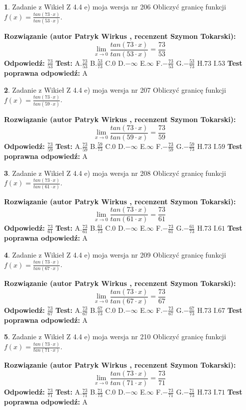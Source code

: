 \documentclass[12pt, a4paper]{article}
\theoremstyle{definition} %
\newtheorem{zad}{}
\newcommand{\zadStart}[1]{\begin{zad}#1\newline}
\newcommand{\zadStop}{\end{zad}}
\newcommand{\rozwStart}[2]{\noindent \textbf{Rozwiązanie (autor #1 , recenzent #2): }\newline}
\newcommand{\rozwStop}{\newline}
\newcommand{\odpStart}{\noindent \textbf{Odpowiedź:}\newline}
\newcommand{\odpStop}{\newline}
\newcommand{\testStart}{\noindent \textbf{Test:}\newline}
\newcommand{\testStop}{\newline}
\newcommand{\kluczStart}{\noindent \textbf{Test poprawna odpowiedź:}\newline}
\newcommand{\kluczStop}{\newline}
\begin{document}
\zadStart{Zadanie z Wikieł Z 4.4 e) moja wersja nr 206}
Obliczyć granicę funkcji $f(x)=\frac{tan(73\cdot x)}{tan(53\cdot x)}$.
\zadStop
\rozwStart{Patryk Wirkus}{Szymon Tokarski}
$$\lim\limits_{x\to 0}\frac{tan(73\cdot x)}{tan(53\cdot x)}=
\frac{73}{53}$$
\rozwStop
\odpStart
$\frac{73}{53}$
\odpStop
\testStart
A.$\frac{73}{53}$
B.$\frac{53}{73}$
C.$0$
D.$-\infty$
E.$\infty$
F.$-\frac{73}{53}$
G.$-\frac{53}{73}$
H.$73$
I.$53$
\testStop
\kluczStart
A
\kluczStop



\zadStart{Zadanie z Wikieł Z 4.4 e) moja wersja nr 207}
Obliczyć granicę funkcji $f(x)=\frac{tan(73\cdot x)}{tan(59\cdot x)}$.
\zadStop
\rozwStart{Patryk Wirkus}{Szymon Tokarski}
$$\lim\limits_{x\to 0}\frac{tan(73\cdot x)}{tan(59\cdot x)}=
\frac{73}{59}$$
\rozwStop
\odpStart
$\frac{73}{59}$
\odpStop
\testStart
A.$\frac{73}{59}$
B.$\frac{59}{73}$
C.$0$
D.$-\infty$
E.$\infty$
F.$-\frac{73}{59}$
G.$-\frac{59}{73}$
H.$73$
I.$59$
\testStop
\kluczStart
A
\kluczStop



\zadStart{Zadanie z Wikieł Z 4.4 e) moja wersja nr 208}
Obliczyć granicę funkcji $f(x)=\frac{tan(73\cdot x)}{tan(61\cdot x)}$.
\zadStop
\rozwStart{Patryk Wirkus}{Szymon Tokarski}
$$\lim\limits_{x\to 0}\frac{tan(73\cdot x)}{tan(61\cdot x)}=
\frac{73}{61}$$
\rozwStop
\odpStart
$\frac{73}{61}$
\odpStop
\testStart
A.$\frac{73}{61}$
B.$\frac{61}{73}$
C.$0$
D.$-\infty$
E.$\infty$
F.$-\frac{73}{61}$
G.$-\frac{61}{73}$
H.$73$
I.$61$
\testStop
\kluczStart
A
\kluczStop



\zadStart{Zadanie z Wikieł Z 4.4 e) moja wersja nr 209}
Obliczyć granicę funkcji $f(x)=\frac{tan(73\cdot x)}{tan(67\cdot x)}$.
\zadStop
\rozwStart{Patryk Wirkus}{Szymon Tokarski}
$$\lim\limits_{x\to 0}\frac{tan(73\cdot x)}{tan(67\cdot x)}=
\frac{73}{67}$$
\rozwStop
\odpStart
$\frac{73}{67}$
\odpStop
\testStart
A.$\frac{73}{67}$
B.$\frac{67}{73}$
C.$0$
D.$-\infty$
E.$\infty$
F.$-\frac{73}{67}$
G.$-\frac{67}{73}$
H.$73$
I.$67$
\testStop
\kluczStart
A
\kluczStop



\zadStart{Zadanie z Wikieł Z 4.4 e) moja wersja nr 210}
Obliczyć granicę funkcji $f(x)=\frac{tan(73\cdot x)}{tan(71\cdot x)}$.
\zadStop
\rozwStart{Patryk Wirkus}{Szymon Tokarski}
$$\lim\limits_{x\to 0}\frac{tan(73\cdot x)}{tan(71\cdot x)}=
\frac{73}{71}$$
\rozwStop
\odpStart
$\frac{73}{71}$
\odpStop
\testStart
A.$\frac{73}{71}$
B.$\frac{71}{73}$
C.$0$
D.$-\infty$
E.$\infty$
F.$-\frac{73}{71}$
G.$-\frac{71}{73}$
H.$73$
I.$71$
\testStop
\kluczStart
A
\kluczStop
\end{document}
